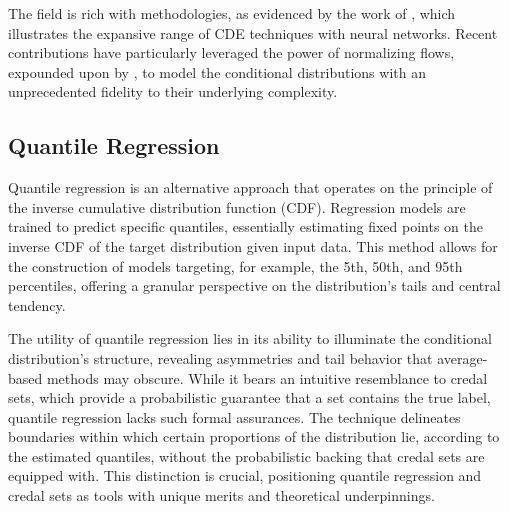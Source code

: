 \documentclass{article}
\begin{document}
The field is rich with methodologies, as evidenced by the work of \cite{rothfuss2019conditional}, which illustrates the expansive range of CDE techniques with neural networks. Recent contributions have particularly leveraged the power of normalizing flows, expounded upon by \cite{trippe2018conditional}, to model the conditional distributions with an unprecedented fidelity to their underlying complexity.

\subsection{Quantile Regression}
Quantile regression is an alternative approach that operates on the principle of the inverse cumulative distribution function (CDF). Regression models are trained to predict specific quantiles, essentially estimating fixed points on the inverse CDF of the target distribution given input data. This method allows for the construction of models targeting, for example, the 5th, 50th, and 95th percentiles, offering a granular perspective on the distribution's tails and central tendency.

The utility of quantile regression lies in its ability to illuminate the conditional distribution's structure, revealing asymmetries and tail behavior that average-based methods may obscure. While it bears an intuitive resemblance to credal sets, which provide a probabilistic guarantee that a set contains the true label, quantile regression lacks such formal assurances. The technique delineates boundaries within which certain proportions of the distribution lie, according to the estimated quantiles, without the probabilistic backing that credal sets are equipped with. This distinction is crucial, positioning quantile regression and credal sets as tools with unique merits and theoretical underpinnings.

\end{document}
